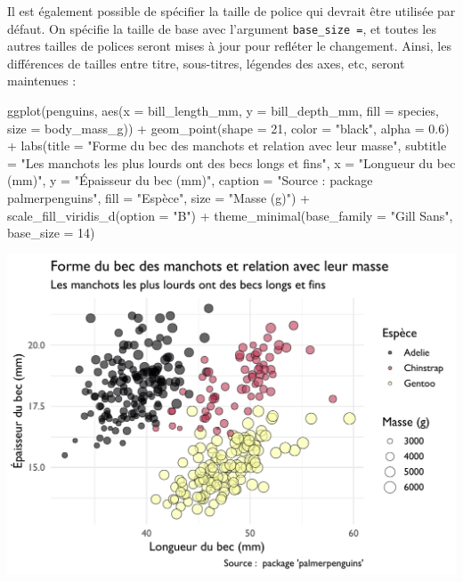 \documentclass[
  a4paper,
  DIV=11,
  numbers=noendperiod,
  oneside]{scrreprt}
\newenvironment{Shaded}{}{}
\newcommand{\AttributeTok}[1]{\textcolor[rgb]{0.84,0.23,0.29}{#1}}
\newcommand{\DecValTok}[1]{\textcolor[rgb]{0.00,0.36,0.77}{#1}}
\newcommand{\FloatTok}[1]{\textcolor[rgb]{0.00,0.36,0.77}{#1}}
\newcommand{\FunctionTok}[1]{\textcolor[rgb]{0.44,0.26,0.76}{#1}}
\newcommand{\NormalTok}[1]{\textcolor[rgb]{0.14,0.16,0.18}{#1}}
\newcommand{\SpecialCharTok}[1]{\textcolor[rgb]{0.00,0.36,0.77}{#1}}
\newcommand{\StringTok}[1]{\textcolor[rgb]{0.01,0.18,0.38}{#1}}
\begin{document}
Il est également possible de spécifier la taille de police qui devrait
être utilisée par défaut. On spécifie la taille de base avec l'argument
\texttt{base\_size\ =}, et toutes les autres tailles de polices seront
mises à jour pour refléter le changement. Ainsi, les différences de
tailles entre titre, sous-titres, légendes des axes, etc, seront
maintenues :

\begin{Shaded}
\begin{Highlighting}[]
\FunctionTok{ggplot}\NormalTok{(penguins, }\FunctionTok{aes}\NormalTok{(}\AttributeTok{x =}\NormalTok{ bill\_length\_mm, }\AttributeTok{y =}\NormalTok{ bill\_depth\_mm,}
                     \AttributeTok{fill =}\NormalTok{ species, }\AttributeTok{size =}\NormalTok{ body\_mass\_g)) }\SpecialCharTok{+}
  \FunctionTok{geom\_point}\NormalTok{(}\AttributeTok{shape =} \DecValTok{21}\NormalTok{, }\AttributeTok{color =} \StringTok{"black"}\NormalTok{, }\AttributeTok{alpha =} \FloatTok{0.6}\NormalTok{) }\SpecialCharTok{+}
  \FunctionTok{labs}\NormalTok{(}\AttributeTok{title =} \StringTok{"Forme du bec des manchots et relation avec leur masse"}\NormalTok{,}
       \AttributeTok{subtitle =} \StringTok{"Les manchots les plus lourds ont des becs longs et fins"}\NormalTok{,}
       \AttributeTok{x =} \StringTok{"Longueur du bec (mm)"}\NormalTok{,}
       \AttributeTok{y =} \StringTok{"Épaisseur du bec (mm)"}\NormalTok{,}
       \AttributeTok{caption =} \StringTok{"Source :  package \textquotesingle{}palmerpenguins\textquotesingle{}"}\NormalTok{,}
       \AttributeTok{fill =} \StringTok{"Espèce"}\NormalTok{,}
       \AttributeTok{size =} \StringTok{"Masse (g)"}\NormalTok{) }\SpecialCharTok{+}
  \FunctionTok{scale\_fill\_viridis\_d}\NormalTok{(}\AttributeTok{option =} \StringTok{"B"}\NormalTok{) }\SpecialCharTok{+}
  \FunctionTok{theme\_minimal}\NormalTok{(}\AttributeTok{base\_family =} \StringTok{"Gill Sans"}\NormalTok{, }\AttributeTok{base\_size =} \DecValTok{14}\NormalTok{)}
\end{Highlighting}
\end{Shaded}

\includegraphics{images/fonts2.pdf}
\end{document}
